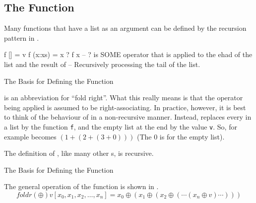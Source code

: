 \subsection{The \texorpdfstring{}{\texttt{foldr}} Function}\label{subsec:Foldr_Function}
Many functions that have a list as an argument can be defined by the recursion pattern in .

\begin{listing}[h!tbp]
\begin{haskellsource}
f [] = v
f (x:xs) = x ? f x
-- ? is SOME operator that is applied to the ehad of the list and the result of
-- Recursively processing the tail of the list.
\end{haskellsource}
\caption{The Basis for Defining the  Function}
\label{lst:Foldr_Basis}
\end{listing}

 is an abbreviation for ``fold right''.
What this really means is that the operator being applied is assumed to be right-associating.
In practice, however, it is best to think of the behaviour of  in a non-recursive manner.
Instead,  replaces every  in a list by the function \texttt{f}, and the empty list at the end by the value \texttt{v}.
So, for example  becomes $(1+(2+(3+0)))$ (The 0 is for the empty list).

The definition of , like many other s, is recursive.

\begin{listing}[h!tbp]
\caption{The Basis for Defining the  Function}
\label{lst:Foldr_Basis}
\end{listing}

The general operation of the  function is shown in .
\begin{equation}\label{eq:General_foldr_Operation}
  foldr (\oplus) v [x_{0}, x_{1}, x_{2}, \ldots, x_{n}] = x_{0} \oplus (x_{1} \oplus (x_{2} \oplus (\cdots (x_{n} \oplus v) \cdots )))
\end{equation}

